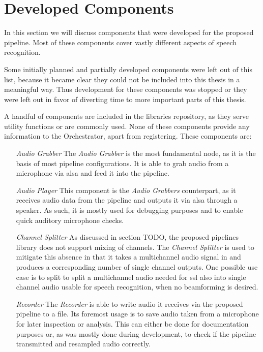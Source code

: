
\section{Developed Components}
\label{main:components:start}
In this section we will discuss components that were developed for the proposed pipeline.
Most of these components cover vastly different aspects of speech recognition.

Some initially planned and partially developed components were left out of this list, because it became clear they could not be included into this thesis in a meaningful way.
Thus development for these components was stopped or they were left out in favor of diverting time to more important parts of this thesis.


A handful of components are included in the libraries repository, as they serve utility functions or are commonly used.
None of these components provide any information to the Orchestrator, apart from registering.
These components are:
\begin{itemize}[leftmargin=1in]
	\item[\textit{Audio Grabber}] The \textit{Audio Grabber} is the most fundamental node, as it is the basis of most pipeline configurations.
	It is able to grab audio from a microphone via \gls{alsa} and feed it into the pipeline.

	\item[\textit{Audio Player}] This component is the \textit{Audio Grabbers} counterpart, as it receives audio data from the pipeline and outputs it via \gls{alsa} through a speaker.
	As such, it is mostly used for debugging purposes and to enable quick auditory microphone checks.

	\item[\textit{Channel Splitter}] As discussed in section TODO, the proposed pipelines library does not support mixing of channels.
	The \textit{Channel Splitter} is used to mitigate this absence in that it takes a multichannel audio signal in and produces a corresponding number of single channel outputs.
	One possible use case is to split to split a multichannel audio needed for \gls{ssl} also into single channel audio usable for speech recognition, when no beamforming is desired.

	\item[\textit{Recorder}] The \textit{Recorder} is able to write audio it receives via the proposed pipeline to a file.
	Its foremost usage is to save audio taken from a microphone for later inspection or analysis.
	This can either be done for documentation purposes or, as was mostly done during development, to check if the pipeline transmitted and resampled audio correctly.
\end{itemize}

